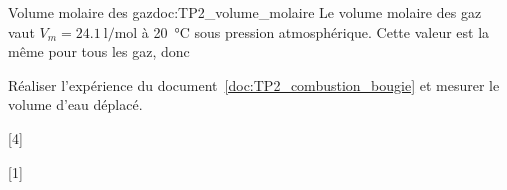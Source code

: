 \begin{doc}{Volume molaire des gaz}{doc:TP2_volume_molaire}
  Le volume molaire des gaz vaut $V_m = \qty{24,1}{\litre\per\mole}$ à \qty{20}{\degreeCelsius} sous pression atmosphérique.
  Cette valeur est la même pour tous les gaz, donc 
\end{doc}

\mesure Réaliser l'expérience du document~\ref{doc:TP2_combustion_bougie} et mesurer le volume d'eau déplacé.

[4]

[1]